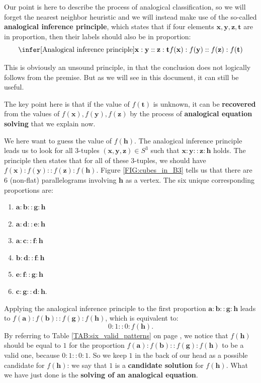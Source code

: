 Our point is here to describe the process of analogical classification, so we
will forget the nearest neighbor heuristic and we will instead make use of the
so-called \textbf{analogical inference principle}, which states that if four
elements $\mathbf{x}, \mathbf{y}, \mathbf{z}, \mathbf{t}$ are in proportion,
then their labels should also be in proportion:
$$
\infer[\text{Analogical inference principle}]{\mathbf{x} : \mathbf{y} ::
\mathbf{z} : \mathbf{t}}{f(\mathbf{x}) : f(\mathbf{y}) :: f(\mathbf{z}) :
f(\mathbf{t})}
$$

This is obviously an unsound principle, in that the conclusion does not
logically follows from the premise. But as we will see in this document, it can
still be useful.

The key point here is that if the value of $f(\mathbf{t})$ is unknown, it can
be \textbf{recovered} from the values of $f(\mathbf{x}), f(\mathbf{y}),
f(\mathbf{z})$ by the process of \textbf{analogical equation solving} that we
explain now.

We here want to guess the
value of $f(\mathbf{h})$. The analogical inference principle leads us to look
for all 3-tuples $(\mathbf{x}, \mathbf{y}, \mathbf{z}) \in S^3$ such that
$\mathbf{x}:\mathbf{y}::\mathbf{z}:\mathbf{h}$ holds.  The principle then states that
for all of these $3$-tuples, we should have
$f(\mathbf{x}):f(\mathbf{y})::f(\mathbf{z}):f(\mathbf{h})$.
Figure \ref{FIG:cubes_in_B3} tells us that there are 6 (non-flat)
parallelograms involving $\mathbf{h}$ as a vertex. The six unique corresponding
proportions are:

\begin{enumerate}
  \item $\mathbf{a} : \mathbf{b} :: \mathbf{g} : \mathbf{h}$
  \item $\mathbf{a} : \mathbf{d} :: \mathbf{e} : \mathbf{h}$
  \item $\mathbf{a} : \mathbf{c} :: \mathbf{f} : \mathbf{h}$
  \item $\mathbf{b} : \mathbf{d} :: \mathbf{f} : \mathbf{h}$
  \item $\mathbf{e} : \mathbf{f} :: \mathbf{g} : \mathbf{h}$
  \item $\mathbf{c} : \mathbf{g} :: \mathbf{d} : \mathbf{h}$.
\end{enumerate}

Applying the analogical inference principle to the first proportion $\mathbf{a}
: \mathbf{b} :: \mathbf{g} : \mathbf{h}$ leads to $f(\mathbf{a}) :
f(\mathbf{b}) :: f(\mathbf{g}) : f(\mathbf{h})$, which is equivalent to:
$$0:1::0:f(\mathbf{h}).$$ By referring to Table \ref{TAB:six_valid_patterns} on
page \pageref{TAB:six_valid_patterns}, we
notice that $f(\mathbf{h})$ should be equal to $1$ for the proportion
$f(\mathbf{a}) : f(\mathbf{b}) :: f(\mathbf{g}) : f(\mathbf{h})$ to be a valid
one, because $0:1::0:1$. So we keep $1$ in the back of our head as a possible
candidate for $f(\mathbf{h})$: we say that $1$ is a \textbf{candidate
solution} for $f(\mathbf{h})$.  What we have just done is the \textbf{solving
of an analogical equation}.

